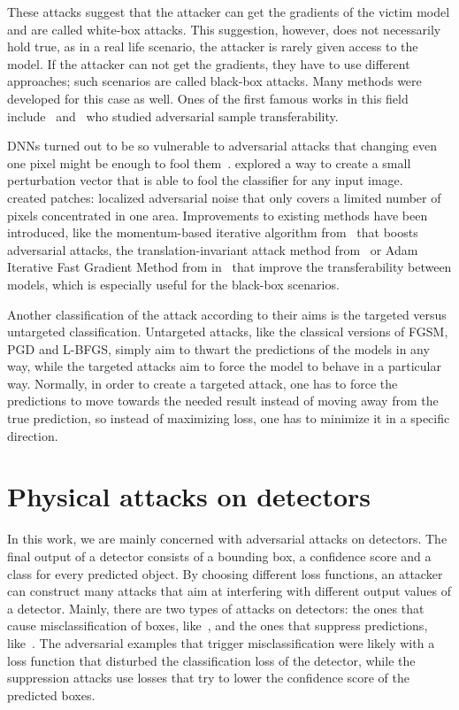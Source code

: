 These attacks suggest that the attacker can get the gradients of the victim model and are called white-box attacks.
This suggestion, however, does not necessarily hold true, as in a real life scenario, the attacker is rarely given access to the model.
If the attacker can not get the gradients, they have to use different approaches; such scenarios are called black-box attacks. 
Many methods were developed for this case as well.
Ones of the first famous works in this field include~\cite{probably_first_bb} and~\cite{famous_bb} who studied adversarial sample transferability.


DNNs turned out to be so vulnerable to adversarial attacks that changing even one pixel might be enough to fool them~\cite{one_pixel}.
\cite{universal} explored a way to create a small perturbation vector that is able to fool the classifier for any input image. 
~\cite{classifier_patch, classifier_patch2} created patches: localized adversarial noise that only covers a limited number of pixels concentrated in one area.
Improvements to existing methods have been introduced, like the momentum-based iterative algorithm from~\cite{adv_momentum} that boosts adversarial attacks, the translation-invariant attack method from~\cite{adv_translation_invariant} or Adam Iterative Fast Gradient Method from in~\cite{adv_optimizer} that improve the transferability between models, which is especially useful for the black-box scenarios.

Another classification of the attack according to their aims is the targeted versus untargeted classification.
Untargeted attacks, like the classical versions of FGSM, PGD and L-BFGS, simply aim to thwart the predictions of the models in any way, while the targeted attacks aim to force the model to behave in a particular way.
Normally, in order to create a targeted attack, one has to force the predictions to move towards the needed result instead of moving away from the true prediction, so instead of maximizing loss, one has to minimize it in a specific direction.

\section{Physical attacks on detectors}
In this work, we are mainly concerned with adversarial attacks on detectors.
The final output of a detector consists of a bounding box, a confidence score and a class for every predicted object.
By choosing different loss functions, an attacker can construct many attacks that aim at interfering with different output values of a detector.
Mainly, there are two types of attacks on detectors: the ones that cause misclassification of boxes, like~\cite{det_misclas}, and the ones that suppress predictions, like~\cite{physical_patch}.
The adversarial examples that trigger misclassification were likely with a loss function that disturbed the classification loss of the detector, while the suppression attacks use losses that try to lower the confidence score of the predicted boxes.

